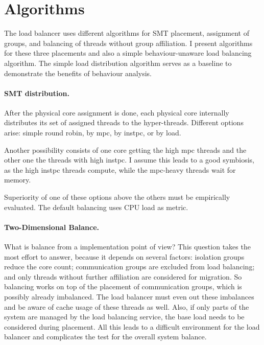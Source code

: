 \pagebreak
\section{Algorithms}
\label{impl:algos}


The load balancer uses different algorithms for SMT placement, assignment of
groups, and balancing of threads without group affiliation.
I present algorithms for these three placements and also a simple behaviour-unaware
load balancing algorithm.
The simple load distribution algorithm serves as a baseline to demonstrate the
benefits of behaviour analysis.

\paragraph{SMT distribution.}
After the physical core assignment is done, each physical core internally
distributes its set of assigned threads to the hyper-threads.
Different options arise: simple round robin, by \gls{mpc}, by \gls{instpc}, or
by load.

Another possibility consists of one core getting the high \gls{mpc}
threads and the other one the threads with high \gls{instpc}.
I assume this leads to a good symbiosis, as the high \gls{instpc} threads compute,
while the \gls{mpc}-heavy threads wait for memory.

Superiority of one of these options above the others must be empirically
evaluated. The default balancing uses CPU load as metric.


\paragraph{Two-Dimensional Balance.}
What is balance from a implementation point of view?
This question takes the most effort to answer, because it
depends on several factors: isolation groups reduce the core count;
communication groups are excluded from load balancing;
and only threads without further affiliation are considered for migration.
So balancing works on top of the placement of communication groups, which is
possibly already imbalanced.
The load balancer must even out these imbalances and be aware of cache usage of
these threads as well.
Also, if only parts of the system are managed by the load balancing service,
the base load needs to be considered during placement.
All this leads to a difficult environment for the load balancer and complicates
the test for the overall system balance.

